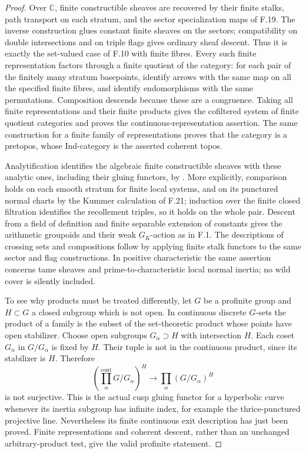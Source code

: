\begin{proof}
Over $\mathbb C$, finite constructible sheaves are recovered by their
finite stalks, path transport on each stratum, and the sector
specialization maps of F.19. The inverse construction glues constant
finite sheaves on the sectors; compatibility on double intersections
and on triple flags gives ordinary sheaf descent. Thus it is exactly
the set-valued case of F.10 with finite fibres. Every such finite
representation factors through a finite quotient of the category:
for each pair of the finitely many stratum basepoints, identify arrows
with the same map on all the specified finite fibres, and identify
endomorphisms with the same permutations. Composition descends because
these are a congruence. Taking all finite representations and their
finite products gives the cofiltered system of finite quotient
categories and proves the continuous-representation assertion.
The same construction for a finite family of representations proves
that the category is a pretopos, whose Ind-category is the asserted
coherent topos.

Analytification identifies the algebraic finite constructible sheaves
with these analytic ones, including their gluing functors, by
\cite[Proposition~12.6.4 and Corollary~12.6.7]{FA_BGH2020}. More
explicitly, comparison holds on each smooth stratum for finite local
systems, and on its punctured normal charts by the Kummer calculation
of F.21; induction over the finite closed filtration identifies the
recollement triples, so it holds on the whole pair. Descent from a
field of definition and finite separable extension of constants gives
the arithmetic groupoids and their weak $G_K$-action as in F.1.
The descriptions of crossing sets and compositions follow by applying
finite stalk functors to the same sector and flag constructions.
In positive characteristic the same assertion concerns tame sheaves
and prime-to-characteristic local normal inertia; no wild cover is
silently included.

To see why products must be treated differently, let $G$ be a
profinite group and $H\subset G$ a closed subgroup which is not open.
In continuous discrete $G$-sets the product of a family is the subset
of the set-theoretic product whose points have open stabilizer. Choose
open subgroups $G_\alpha\supset H$ with intersection $H$. Each coset
$G_\alpha$ in $G/G_\alpha$ is fixed by $H$. Their tuple is not in the
continuous product, since its stabilizer is $H$. Therefore
\[
 \left(\prod_{\alpha}^{\mathrm{cont}}G/G_\alpha\right)^H
 \longrightarrow\prod_\alpha(G/G_\alpha)^H
\]
is not surjective. This is the actual cusp gluing functor for a
hyperbolic curve whenever its inertia subgroup has infinite index,
for example the thrice-punctured projective line. Nevertheless its
finite continuous exit description has just been proved. Finite
representations and coherent descent, rather than an unchanged
arbitrary-product test, give the valid profinite statement.
\end{proof}

